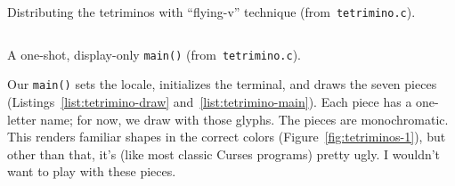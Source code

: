 \begin{listing}[!htbp]
\inputminted[]{C}{code/tetrimino-draw.h}
\caption{Distributing the tetriminos with ``flying-v'' technique (from~\texttt{tetrimino.c}).}
\label{list:tetrimino-draw}
\end{listing}

\begin{listing}[!htbp]
\inputminted[]{C}{code/tetrimino-main.h}
\caption{A one-shot, display-only \texttt{main()} (from~\texttt{tetrimino.c}).}
\label{list:tetrimino-main}
\end{listing}

Our \texttt{main()} sets the locale, initializes the terminal, and draws the
seven pieces (Listings~\ref{list:tetrimino-draw} and~\ref{list:tetrimino-main}).
Each piece has a one-letter name; for now, we draw with those glyphs. The
pieces are monochromatic. This renders familiar shapes in the correct colors
(Figure~\ref{fig:tetriminos-1}), but other than that, it's (like most classic
Curses programs) pretty ugly. I wouldn't want to play with these pieces.

